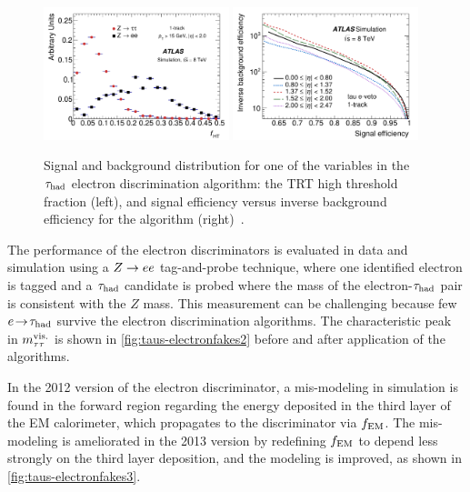 \begin{figure}[tp]
  \centering
  \includegraphics[width=0.48\textwidth]{figures/PERF-2013-06/fig_08a}
  \includegraphics[width=0.48\textwidth]{figures/PERF-2013-06/fig_09}
  \caption{Signal and background distribution for one of the variables in the $\tau_\text{had}$ electron discrimination algorithm: the TRT high threshold fraction (left), and signal efficiency versus inverse background efficiency for the algorithm (right)~\cite{PERF-2013-06}.}
  \label{fig:taus-electronfakes1}
\end{figure}

The performance of the electron discriminators is evaluated in data and simulation using a $Z \rightarrow ee$ tag-and-probe technique, where one identified electron is tagged and a $\tau_\text{had}$ candidate is probed where the mass of the electron-$\tau_\text{had}$ pair is consistent with the $Z$ mass. This measurement can be challenging because few $e \!\rightarrow\!\tau_\text{had}$ survive the electron discrimination algorithms. The characteristic peak in $m_{\tau\tau}^\text{vis.}$ is shown in \cref{fig:taus-electronfakes2} before and after application of the algorithms.

In the 2012 version of the electron discriminator, a mis-modeling in simulation is found in the forward region regarding the energy deposited in the third layer of the EM calorimeter, which propagates to the discriminator via $f_\mathrm{EM}$. The mis-modeling is ameliorated in the 2013 version by redefining $f_\mathrm{EM}$ to depend less strongly on the third layer deposition, and the modeling is improved, as shown in \cref{fig:taus-electronfakes3}.

